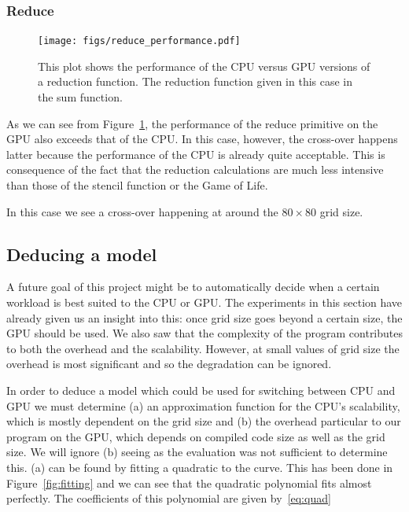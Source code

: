 \documentclass[
    12pt,
    a4paper,
    twoside,
    openright,
    ]{scrbook}
\begin{document}
\subsubsection{Reduce}

\begin{figure}[h]
  \texttt{[image: figs/reduce\_performance.pdf]}
  \caption{This plot shows the performance of the CPU versus GPU versions of a
    reduction function. The reduction function given in this case in the sum
    function.}
  \label{fig:reduceperf}
\end{figure}

As we can see from Figure~\ref{fig:reduceperf}, the performance of the reduce
primitive on the GPU also exceeds that of the CPU. In this case, however, the
cross-over happens latter because the performance of the CPU is already quite
acceptable. This is consequence of the fact that the reduction calculations are
much less intensive than those of the stencil function or the Game of Life.

In this case we see a cross-over happening at around the $80 \times 80$ grid size.

\subsection{Deducing a model}

A future goal of this project might be to automatically decide when a certain
workload is best suited to the CPU or GPU. The experiments in this section have
already given us an insight into this: once grid size goes beyond a certain
size, the GPU should be used. We also saw that the complexity of the program
contributes to both the overhead and the scalability. However, at small values
of grid size the overhead is most significant and so the degradation can be
ignored.

In order to deduce a model which could be used for switching between CPU and GPU
we must determine (a) an approximation function for the CPU's scalability, which
is mostly dependent on the grid size and (b) the overhead particular to our
program on the GPU, which depends on compiled code size as well as the grid
size. We will ignore (b) seeing as the evaluation was not sufficient to
determine this. (a) can be found by fitting a quadratic to the curve. This has
been done in Figure~\ref{fig:fitting} and we can see that the quadratic
polynomial fits almost perfectly. The coefficients of this polynomial are given
by~\autoref{eq:quad}
\end{document}
